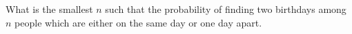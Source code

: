   What is the smallest $n$ such that
  the probability of finding two birthdays among $n$ people
  which are either on the same day or one day apart.
